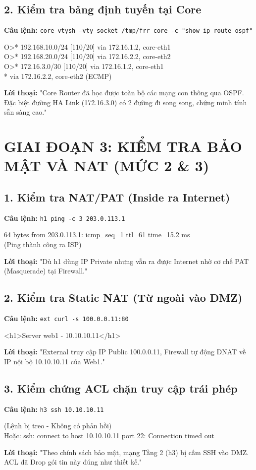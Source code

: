 \documentclass[12pt,a4paper]{article}
\begin{document}
\subsection{2. Kiểm tra bảng định tuyến tại Core}
\textbf{Câu lệnh:} \texttt{core vtysh --vty_socket /tmp/frr_core -c "show ip route ospf"}
\begin{expectedoutput}
O>* 192.168.10.0/24 [110/20] via 172.16.1.2, core-eth1 \\
O>* 192.168.20.0/24 [110/20] via 172.16.2.2, core-eth2 \\
O>* 172.16.3.0/30   [110/20] via 172.16.1.2, core-eth1 \\
\hspace*{4cm} * via 172.16.2.2, core-eth2 (ECMP)
\end{expectedoutput}
\textbf{Lời thoại: } "Core Router đã học được toàn bộ các mạng con thông qua OSPF. Đặc biệt đường HA Link (172.16.3.0) có 2 đường đi song song, chứng minh tính sẵn sàng cao."

\newpage
\section{GIAI ĐOẠN 3: KIỂM TRA BẢO MẬT VÀ NAT (MỨC 2 \& 3)}

\subsection{1. Kiểm tra NAT/PAT (Inside ra Internet)}
\textbf{Câu lệnh:} \texttt{h1 ping -c 3 203.0.113.1}
\begin{expectedoutput}
64 bytes from 203.0.113.1: icmp_seq=1 ttl=61 time=15.2 ms \\
(Ping thành công ra ISP)
\end{expectedoutput}
\textbf{Lời thoại: } "Dù h1 dùng IP Private nhưng vẫn ra được Internet nhờ cơ chế PAT (Masquerade) tại Firewall."

\subsection{2. Kiểm tra Static NAT (Từ ngoài vào DMZ)}
\textbf{Câu lệnh:} \texttt{ext curl -s 100.0.0.11:80}
\begin{expectedoutput}
<h1>Server web1 - 10.10.10.11</h1>
\end{expectedoutput}
\textbf{Lời thoại: } "External truy cập IP Public 100.0.0.11, Firewall tự động DNAT về IP nội bộ 10.10.10.11 của Web1."

\subsection{3. Kiểm chứng ACL chặn truy cập trái phép}
\textbf{Câu lệnh:} \texttt{h3 ssh 10.10.10.11}
\begin{expectedoutput}
(Lệnh bị treo - Không có phản hồi) \\
Hoặc: ssh: connect to host 10.10.10.11 port 22: Connection timed out
\end{expectedoutput}
\textbf{Lời thoại: } "Theo chính sách bảo mật, mạng Tầng 2 (h3) bị cấm SSH vào DMZ. ACL đã Drop gói tin này đúng như thiết kế."
\end{document}
